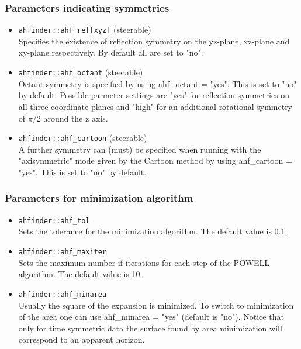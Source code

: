 \subsubsection*{Parameters indicating symmetries}
\begin{itemize}
\item {\tt ahfinder::ahf\_ref[xyz]} (steerable) \\
        Specifies the existence of reflection symmetry on the yz-plane,
        xz-plane and xy-plane respectively. By default all are set to "no".
\item {\tt ahfinder::ahf\_octant} (steerable) \\
        Octant symmetry is specified by using ahf\_octant = "yes". This is set
        to "no" by default. Possible parmeter settings are "yes" for reflection
        symmetries on all three coordinate planes and "high" for an additional
        rotational symmetry of $\pi/2$ around the z axis.
\item {\tt ahfinder::ahf\_cartoon} (steerable) \\
        A further symmetry can (must) be specified when running with the
        "axisymmetric" mode given by the Cartoon method by using
        ahf\_cartoon = "yes". This is set to "no" by default.
\end{itemize}
\subsubsection*{Parameters for minimization algorithm}
\begin{itemize}
\item {\tt ahfinder::ahf\_tol} \\
        Sets the tolerance for the minimization algorithm. The default
        value is 0.1.
\item {\tt ahfinder::ahf\_maxiter} \\
        Sets the maximum number if iterations for each step of the POWELL
        algorithm. The default value is 10.
\item {\tt ahfinder::ahf\_minarea} \\
        Usually the square of the expansion is minimized. To switch to
        minimization of the area one can use ahf\_minarea = "yes"
        (default is "no"). Notice that only for time symmetric data the
        surface found by area minimization will correspond to an apparent
        horizon.
\end{itemize}
